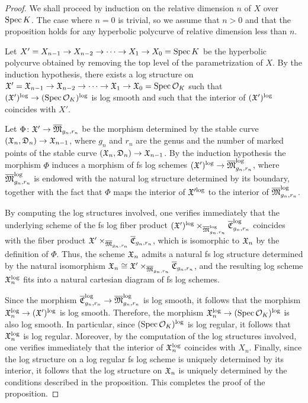 \begin{proof}
  We shall proceed by induction on the relative dimension $n$ of $X$ over $\mathrm{Spec} \, K$. The case where $n = 0$ is trivial, so we assume that $n > 0$ and that the proposition holds for any hyperbolic polycurve of relative dimension less than $n$.

  Let $X' = X_{n - 1} \to X_{n - 2} \to \cdots \to X_1 \to X_0 = \mathrm{Spec} \, K$ be the hyperbolic polycurve obtained by removing the top level of the parametrization of $X$. By the induction hypothesis, there exists a log structure on $\mathfrak{X}' = \mathfrak{X}_{n - 1} \to \mathfrak{X}_{n - 2} \to \cdots \to \mathfrak{X}_1 \to \mathfrak{X}_0 = \mathrm{Spec} \, \mathcal{O}_K$ such that $(\mathfrak{X}')^\mathrm{log} \to (\mathrm{Spec} \, \mathcal{O}_K)^\mathrm{log}$ is log smooth and such that the interior of $(\mathfrak{X}')^\mathrm{log}$ coincides with $X'$.

  Let $\Phi \colon \mathfrak{X}' \to \overline{\mathfrak{M}}_{g_n, r_n}$ be the morphism determined by the stable curve $(\mathfrak{X}_n, \mathfrak{D}_n) \to \mathfrak{X}_{n - 1}$, where $g_n$ and $r_n$ are the genus and the number of marked points of the stable curve $(\mathfrak{X}_n, \mathfrak{D}_n) \to \mathfrak{X}_{n - 1}$. By the induction hypothesis the morphism $\Phi$ induces a morphism of fs log schemes $(\mathfrak{X}')^{\mathrm{log}} \to \overline{\mathfrak{M}}_{g_n, r_n}^\mathrm{log}$, where $\overline{\mathfrak{M}}_{g_n, r_n}^\mathrm{log}$ is endowed with the natural log structure determined by its boundary, together with the fact that $\Phi$ maps the interior of $\mathfrak{X}'^{\mathrm{log}}$ to the interior of $\overline{\mathfrak{M}}_{g_n, r_n}^\mathrm{log}$.
  
  By computing the log structures involved, one verifies immediately that the underlying scheme of the fs log fiber product $(\mathfrak{X}')^{\mathrm{log}} \times_{\overline{\mathfrak{M}}_{g_n, r_n}^\mathrm{log}} \overline{\mathfrak{C}}_{g_n, r_n}^\mathrm{log}$ coincides with the fiber product $\mathfrak{X}' \times_{\overline{\mathfrak{M}}_{g_n, r_n}} \overline{\mathfrak{C}}_{g_n, r_n}$, which is isomorphic to $\mathfrak{X}_n$ by the definition of $\Phi$. Thus, the scheme $\mathfrak{X}_n$ admits a natural fs log structure determined by the natural isomorphism $\mathfrak{X}_n \cong \mathfrak{X}' \times_{\overline{\mathfrak{M}}_{g_n, r_n}} \overline{\mathfrak{C}}_{g_n, r_n}$, and the resulting log scheme $\mathfrak{X}_n^{\mathrm{log}}$ fits into a natural cartesian diagram of fs log schemes.
  
  Since the morphism $\overline{\mathfrak{C}}_{g_n, r_n}^\mathrm{log} \to \overline{\mathfrak{M}}_{g_n, r_n}^\mathrm{log}$ is log smooth, it follows that the morphism $\mathfrak{X}_n^{\mathrm{log}} \to (\mathfrak{X}')^{\mathrm{log}}$ is log smooth. Therefore, the morphism $\mathfrak{X}_n^{\mathrm{log}} \to (\mathrm{Spec} \, \mathcal{O}_K)^{\mathrm{log}}$ is also log smooth. In particular, since $(\mathrm{Spec} \, \mathcal{O}_K)^{\mathrm{log}}$ is log regular, it follows that $\mathfrak{X}_n^{\mathrm{log}}$ is log regular. Moreover, by the computation of the log structures involved, one verifies immediately that the interior of $\mathfrak{X}_n^{\mathrm{log}}$ coincides with $X_n$. Finally, since the log structure on a log regular fs log scheme is uniquely determined by its interior, it follows that the log structure on $\mathfrak{X}_n$ is uniquely determined by the conditions described in the proposition. This completes the proof of the proposition.
\end{proof}


